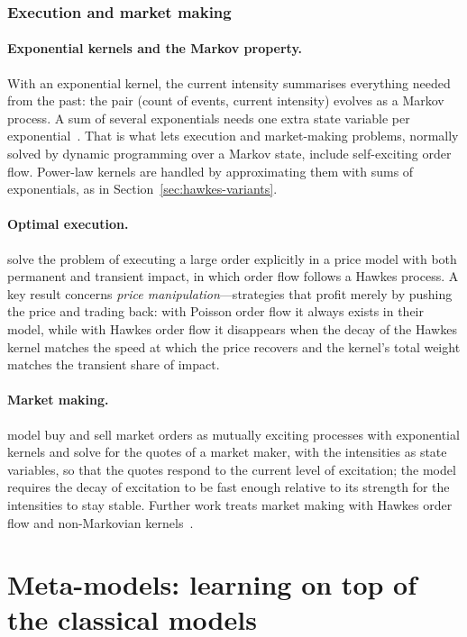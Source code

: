 \subsubsection{Execution and market making}
\label{sec:hawkes-control}

\paragraph{Exponential kernels and the Markov property.} With an exponential kernel, the
current intensity summarises everything needed from the past: the pair (count of events, current intensity)
evolves as a Markov process. A sum of several exponentials needs one extra state variable per
exponential~\citep{bacry2015}. That is what lets execution and market-making problems, normally solved by
dynamic programming over a Markov state, include self-exciting order flow. Power-law kernels are handled by
approximating them with sums of exponentials, as in Section~\ref{sec:hawkes-variants}.

\paragraph{Optimal execution.} \citet{alfonsiblanc2016} solve the problem of executing a large order
explicitly in a price model with both permanent and transient impact, in which order flow follows a
Hawkes process. A key result concerns \emph{price manipulation}---strategies that profit merely by
pushing the price and trading back: with Poisson order flow it always exists in their model, while with
Hawkes order flow it disappears when the decay of the Hawkes kernel matches the speed at which the price
recovers and the kernel's total weight matches the transient share of impact.

\paragraph{Market making.} \citet{cartea2014buylow} model buy and sell market orders as mutually exciting
processes with exponential kernels and solve for the quotes of a market maker, with the intensities as
state variables, so that the quotes respond to the current level of excitation; the model requires the
decay of excitation to be fast enough relative to its strength for the intensities to stay stable. Further work treats market making with Hawkes order flow and
non-Markovian kernels~\citep{jusselin2021mm}.

\section{Meta-models: learning on top of the classical models}
\label{sec:meta}

